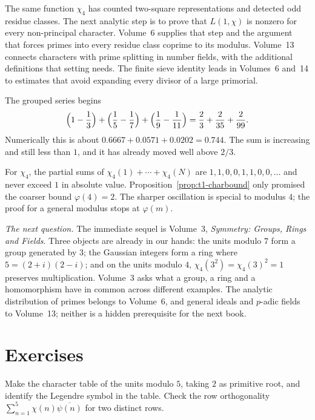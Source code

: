 \begin{beauty}
The same function $\chi_4$ has counted two-square representations and detected odd residue classes. The next analytic step is to prove that $L(1,\chi)$ is nonzero for every non-principal character. Volume~6 supplies that step and the argument that forces primes into every residue class coprime to its modulus. Volume~13 connects characters with prime splitting in number fields, with the additional definitions that setting needs. The finite sieve identity leads in Volumes~6 and~14 to estimates that avoid expanding every divisor of a large primorial.
\end{beauty}

\begin{examplex}
The grouped series begins
\[
\Bigl(1-\frac13\Bigr)+\Bigl(\frac15-\frac17\Bigr)+\Bigl(\frac19-\frac1{11}\Bigr)
=\frac23+\frac2{35}+\frac2{99}.
\]
Numerically this is about $0.6667+0.0571+0.0202=0.744$. The sum is increasing and still less than $1$, and it has already moved well above $2/3$.
\end{examplex}

\begin{examplex}
For $\chi_4$, the partial sums of $\chi_4(1)+\cdots+\chi_4(N)$ are $1,1,0,0,1,1,0,0,\ldots$ and never exceed $1$ in absolute value. Proposition~\ref{prop:t1-charbound} only promised the coarser bound $\varphi(4)=2$. The sharper oscillation is special to modulus $4$; the proof for a general modulus stops at $\varphi(m)$.
\end{examplex}

\medskip
\noindent\emph{The next question.} The immediate sequel is Volume~3, \emph{Symmetry: Groups, Rings and Fields}. Three objects are already in our hands: the units modulo $7$ form a group generated by $3$; the Gaussian integers form a ring where $5=(2+i)(2-i)$; and on the units modulo $4$, $\chi_4(3^2)=\chi_4(3)^2=1$ preserves multiplication. Volume~3 asks what a group, a ring and a homomorphism have in common across different examples. The analytic distribution of primes belongs to Volume~6, and general ideals and $p$-adic fields to Volume~13; neither is a hidden prerequisite for the next book.

\section{Exercises}

\begin{exercise}[$\star$]\label{ex:t1-char5}
Make the character table of the units modulo $5$, taking $2$ as primitive root, and identify the Legendre symbol in the table. Check the row orthogonality $\sum_{n=1}^5\chi(n)\overline{\psi(n)}$ for two distinct rows.
\end{exercise}

